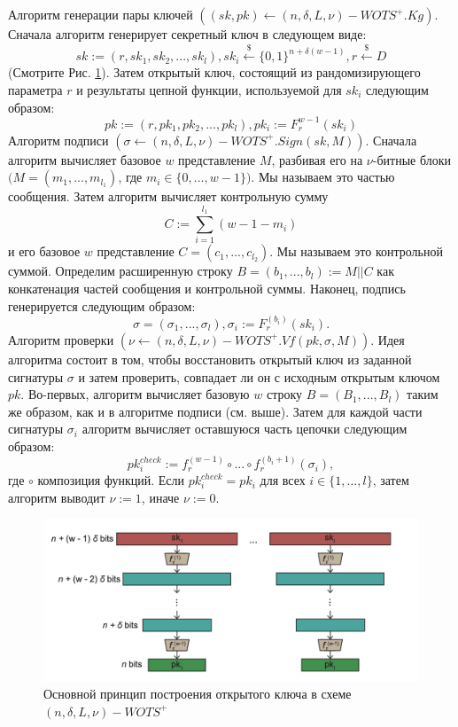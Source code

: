 \documentclass[a4paper, 14pt]{extarticle}
\begin{document}
Алгоритм генерации пары ключей $((sk, pk) \leftarrow (n, \delta, L, \nu)-WOTS^{+}.Kg)$. Сначала алгоритм генерирует секретный ключ в следующем виде:
\[sk := (r, sk_{1}, sk_{2}, ..., sk_{l}), sk_{i} \stackrel{\$}{\leftarrow} \{0, 1\}^{n+\delta(w - 1)}, r \stackrel{\$}{\leftarrow} D\]
(Смотрите Рис. \ref{fig:wots1}). Затем открытый ключ, состоящий из рандомизирующего параметра $r$ и результаты цепной функции, используемой для $sk_{i}$ следующим образом:
\[ pk := (r, pk_{1}, pk_{2}, ..., pk_{l}), pk_{i} := F^{w - 1}_{r}(sk_{i})\]
Алгоритм подписи $(\sigma \leftarrow (n, \delta, L, \nu)-WOTS^{+}.Sign(sk, M))$. Сначала алгоритм вычисляет базовое $w$ представление $M$, разбивая его на $\nu$-битные блоки $(M = (m_{1}, ..., m_{l_{1}})$, где $m_{i} \in \{0, ..., w - 1\})$. Мы называем это частью сообщения. Затем алгоритм вычисляет контрольную сумму
\[ C := \sum^{l_{1}}_{i = 1}(w - 1 - m_{i}) \]
и его базовое $w$ представление $C = (c_{1}, ..., c_{l_{2}})$. Мы называем это контрольной суммой. Определим расширенную строку $B = (b_{1}, ..., b_{l}) := M||C$ как конкатенация частей сообщения и контрольной суммы. Наконец, подпись генерируется следующим образом:
\[ \sigma = (\sigma_{1}, ..., \sigma_{l}), \sigma_{i} := F^{(b_{i})}_{r}(sk_{i}). \]
Алгоритм проверки $(\nu \leftarrow (n, \delta, L, \nu)-WOTS^{+}.Vf(pk, \sigma, M))$. Идея алгоритма состоит в том, чтобы восстановить открытый ключ из заданной сигнатуры $\sigma$ и затем проверить, совпадает ли он с исходным открытым ключом $pk$. Во-первых, алгоритм вычисляет базовую $w$ строку $B = (B_{1}, ..., B_{l})$ таким же образом, как и в алгоритме подписи (см. выше). Затем для каждой части сигнатуры $\sigma_{i}$ алгоритм вычисляет оставшуюся часть цепочки следующим образом:
\[pk^{check}_{i} := f^{(w - 1)}_{r} \circ ... \circ f^{(b_{i}+1)}_{r}(\sigma_{i}),\]
где $\circ$ композиция функций. Если $pk^{check}_{i} = pk_{i}$ для всех $i \in \{1, ..., l\}$, затем алгоритм выводит $\nu := 1$, иначе $\nu := 0$.
\begin{figure}[h]
    \centering
    \includegraphics[scale=0.7]{WOTS+_1.png}
    \caption{Основной принцип построения открытого ключа в схеме $(n, \delta, L, \nu)-WOTS^{+}$ }
    \label{fig:wots1}
\end{figure}
\end{document}
